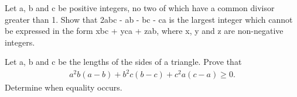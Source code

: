 \item Let a, b and c be positive integers, no two of which have a common divisor greater than 1. Show that 2abc - ab - bc - ca is the largest integer which cannot be expressed in the form xbc + yca + zab, where x, y and z are non-negative integers.

\item Let a, b and c be the lengths of the sides of a triangle. Prove that
\begin{align*}
a^{2}b(a - b) + b^{2}c(b - c) + c^{2}a(c - a) \geq 0.
\end{align*}
Determine when equality occurs.


